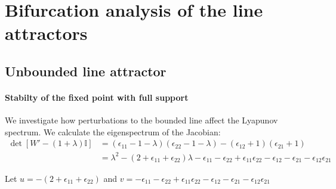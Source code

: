 \documentclass{article} %
\newcounter{ct}
\newcommand{\win}{\vW_{\text{in}}}
\newcommand{\wout}{\vW_{\text{out}}}
\newcommand{\bout}{\vb_{\text{out}}}
\theoremstyle{definition}
\theoremstyle{remark}
\begin{document}
\section{Bifurcation analysis of the line attractors}


\subsection{Unbounded line attractor}
%
%


\paragraph{Stabilty of the fixed point with full support}
We investigate how perturbations to the bounded line affect the Lyapunov spectrum.
We calculate the eigenspectrum of the Jacobian:
\begin{align*}
\det [W' -(1+\lambda)\mathbb{I}] &= (\epsilon_{11}-1-\lambda)(\epsilon_{22}-1-\lambda)-(\epsilon_{12}+1)(\epsilon_{21}+1)\\
&=\lambda^2 - (2+\epsilon_{11}+\epsilon_{22})\lambda -\epsilon_{11}-\epsilon_{22}+\epsilon_{11}\epsilon_{22} -\epsilon_{12} - \epsilon_{21} - \epsilon_{12}\epsilon_{21}
\end{align*}

Let 
$u=- (2+\epsilon_{11}+\epsilon_{22})$
and 
$v=-\epsilon_{11}-\epsilon_{22}+\epsilon_{11}\epsilon_{22} -\epsilon_{12} - \epsilon_{21} - \epsilon_{12}\epsilon_{21}$
\end{document}
